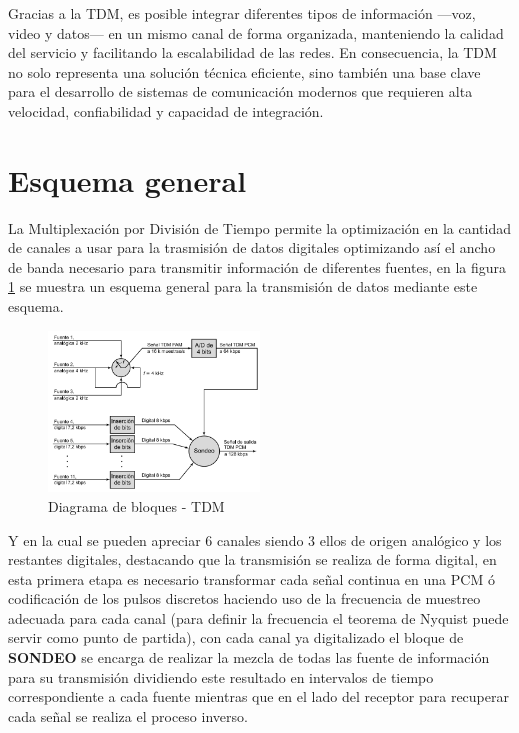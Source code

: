 \documentclass[conference]{IEEEtran}
\begin{document}
	Gracias a la TDM, es posible integrar diferentes tipos de información —voz, video y datos— en un mismo canal de forma organizada, manteniendo la calidad del servicio y facilitando la escalabilidad de las redes. En consecuencia, la TDM no solo representa una solución técnica eficiente, sino también una base clave para el desarrollo de sistemas de comunicación modernos que requieren alta velocidad, confiabilidad y capacidad de integración.
	
	\section{\textbf{Esquema general}}
	
	La Multiplexación por División de Tiempo permite la optimización en la cantidad de canales a usar para la trasmisión de datos digitales optimizando así el ancho de banda necesario para transmitir información de diferentes fuentes, en la figura \ref{fig:pcm-blocks} se muestra un esquema general para la transmisión de datos mediante este esquema.
	
	\begin{figure}[h]
		\centering
		\includegraphics[width=0.5\textwidth]{media/pcm-blocks}
		\caption{Diagrama de bloques - TDM}
		\label{fig:pcm-blocks}
	\end{figure}
	
	Y en la cual se pueden apreciar 6 canales siendo 3 ellos de origen analógico y los restantes digitales, destacando que la transmisión se realiza de forma digital, en esta primera etapa es necesario transformar cada señal continua en una PCM ó  codificación de los pulsos discretos haciendo uso de la frecuencia de muestreo adecuada para cada canal (para definir la frecuencia el teorema de Nyquist puede servir como punto de partida), con cada canal ya digitalizado el bloque de \textbf{SONDEO} \cite{stallings2004comunicaciones} se encarga de realizar la mezcla de todas las fuente de información para su transmisión dividiendo este resultado en intervalos de tiempo correspondiente a cada fuente mientras que en el lado del receptor para recuperar cada señal se realiza el proceso inverso.
	
\end{document}
